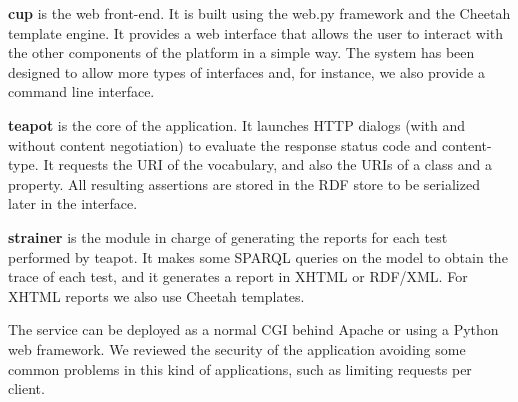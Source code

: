 \documentclass{../templates/llncs}
\begin{document}
\begin{description}

  \item \textbf{cup} is the web front-end. It is built using the web.py framework
        and the Cheetah template engine. It provides a web interface that allows 
        the user to interact with the other components of the platform in a 
        simple way. The system has been designed to allow more types 
        of interfaces and, for instance, we also provide a command line interface.

  \item \textbf{teapot} is the core of the application. It launches
        HTTP dialogs 
        (with and without content negotiation) to evaluate the response
        status code and content-type. It requests the URI of the vocabulary, and 
        also the URIs of a class and a property. All resulting assertions are 
        stored in the RDF store to be serialized later in the interface.

  \item \textbf{strainer} is the module in charge of generating the reports for
        each test performed by teapot. It makes some SPARQL %
        queries on the model to obtain the trace of each test, and it generates 
        a report in XHTML or RDF/XML. For XHTML reports we also use Cheetah 
        templates.

\end{description}

The service can be deployed as a normal CGI behind Apache or using a Python web 
framework. We reviewed the security of the application avoiding some common problems
in this kind of applications, such as limiting requests per client.
\end{document}
